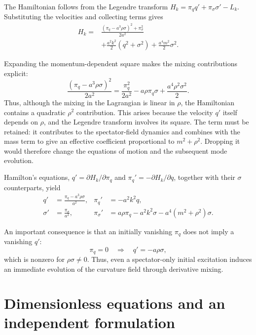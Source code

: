 \documentclass[11pt,a4paper]{article}
\begin{document}
The Hamiltonian follows from the Legendre transform
$H_k=\pi_qq'+\pi_\sigma\sigma'-L_k$.
Substituting the velocities and collecting terms gives
\begin{align}
H_k={}&\frac{(\pi_q-a^3\rho\sigma)^2+\pi_\sigma^2}{2a^2}
\nonumber\\
&+\frac{a^2k^2}{2}(q^2+\sigma^2)
+\frac{a^4m^2}{2}\sigma^2.
\end{align}

Expanding the momentum-dependent square makes the mixing contributions explicit:
\begin{equation}
\frac{(\pi_q-a^3\rho\sigma)^2}{2a^2}
=\frac{\pi_q^2}{2a^2}-a\rho\pi_q\sigma
+\frac{a^4\rho^2\sigma^2}{2}.
\end{equation}
Thus, although the mixing in the Lagrangian is linear in $\rho$,
the Hamiltonian contains a quadratic $\rho^2$ contribution.
This arises because the velocity $q'$ itself depends on $\rho$,
and the Legendre transform involves its square. The term must be
retained: it contributes to the spectator-field dynamics and
combines with the mass term to give an effective coefficient
proportional to $m^2+\rho^2$. Dropping it would therefore change
the equations of motion and the subsequent mode evolution.

Hamilton's equations,
$q'=\partial H_k/\partial\pi_q$ and
$\pi_q'=-\partial H_k/\partial q$, together with their
$\sigma$ counterparts, yield
\begin{align}
q'&=\frac{\pi_q-a^3\rho\sigma}{a^2},
&\pi_q'&=-a^2k^2q,\\
\sigma'&=\frac{\pi_\sigma}{a^2},
&\pi_\sigma'&=a\rho\pi_q-a^2k^2\sigma
-a^4(m^2+\rho^2)\sigma.
\end{align}

An important consequence is that an initially vanishing
$\pi_q$ does not imply a vanishing $q'$:
\begin{equation}
\pi_q = 0\quad\Longrightarrow\quad
q'=-a\rho\sigma,
\end{equation}
which is nonzero for $\rho\sigma\neq0$. Thus, even a
spectator-only initial excitation induces an immediate
evolution of the curvature field through derivative mixing.

\newpage
\section{Dimensionless equations and an independent formulation}
\end{document}
